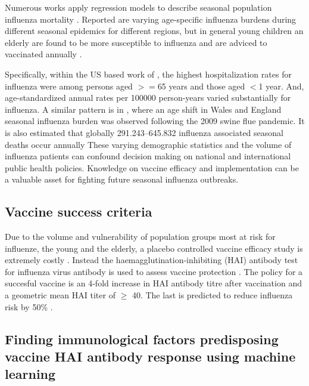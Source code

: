 Numerous works apply regression models to describe seasonal population
influenza mortality \citep{zhouHospitalizationsAssociatedInfluenza2012,
greenMortalityAttributableInfluenza2013, iulianoEstimatesGlobalSeasonal2018}.
Reported are varying age-specific influenza burdens during different seasonal
epidemics for different regions, but in general young children an elderly are
found to be more susceptible to influenza and are adviced to vaccinated
annually \citep{zhouHospitalizationsAssociatedInfluenza2012}.

Specifically, within the US based work of
\cite{zhouHospitalizationsAssociatedInfluenza2012}, the highest hospitalization
rates for influenza were among persons aged $>=$65 years and those aged $<$1
year.  And, age-standardized annual rates per 100000 person-years varied
substantially for influenza. A similar pattern is in
\cite{greenMortalityAttributableInfluenza2013}, where an age shift in Wales and
England seasonal influenza burden was observed following the 2009 swine flue
pandemic. It is also estimated that globally 291.243–645.832 influenza associated
seasonal deaths occur annually \citep{iulianoEstimatesGlobalSeasonal2018} These
varying demographic statistics and the volume of influenza patients can confound
decision making on national and international public health policies.
Knowledge on vaccine efficacy and implementation can be a valuable asset for
fighting future seasonal influenza outbreaks.

\subsection{Vaccine success criteria}

Due to the volume and vulnerability of population groups most at risk for
influenze, the young and the elderly, a placebo controlled vaccine efficacy
study is extremely costly \citep{zhouHospitalizationsAssociatedInfluenza2012}.
Instead the haemagglutination-inhibiting (HAI) antibody test for influenza
virus antibody is used to assess vaccine protection
\citep{dejongHaemagglutinationinhibitingAntibodyInfluenza2003}. The policy for
a succesful vaccine is an 4-fold increase in HAI antibody titre after
vaccination and a geometric mean HAI titer of $\geq$ 40. The last is predicted
to reduce influenza risk by 50\%
\cite{dejongHaemagglutinationinhibitingAntibodyInfluenza2003}.

\subsection{Finding immunological factors predisposing vaccine HAI antibody response using machine learning}

